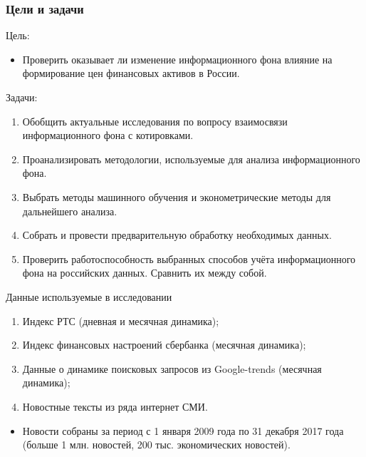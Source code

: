 \documentclass[c, dvipsnames]{beamer}  %
\begin{document}
\begin{frame}[shrink=3]
\frametitle{Цели и задачи}
	\begin{block}{Цель:}
	\begin{itemize}
	    \item Проверить оказывает ли изменение информационного фона влияние на формирование цен финансовых активов в России.
	    
	\end{itemize}

	\end{block}

	 	\begin{block}{Задачи:}
			\begin{enumerate}
	\item Обобщить актуальные исследования по вопросу взаимосвязи информационного фона с котировками.
	\item Проанализировать методологии, используемые для анализа информационного фона.
	\item Выбрать методы машинного обучения и эконометрические методы для дальнейшего анализа.
	\item Собрать и провести предварительную обработку необходимых данных.
	\item Проверить работоспособность выбранных способов учёта информационного фона на российских данных. Сравнить их между собой.
	 \end{enumerate}
	\end{block}
\end{frame}



\begin{frame}[c]{Данные используемые в исследовании}
\begin{enumerate}
\item  Индекс РТС  (дневная и месячная динамика);
\item  Индекс финансовых настроений сбербанка (месячная динамика);
\item  Данные о динамике поисковых запросов из Google-trends  (месячная динамика);
\item  Новостные тексты из ряда интернет СМИ.
\end{enumerate}

\vfill

\begin{itemize}
	\item  Новости собраны за период с 1 января 2009 года по 31 декабря 2017 года (больше 1 млн. новостей, 200 тыс. экономических новостей).
\end{itemize}
\end{frame}
\end{document}
